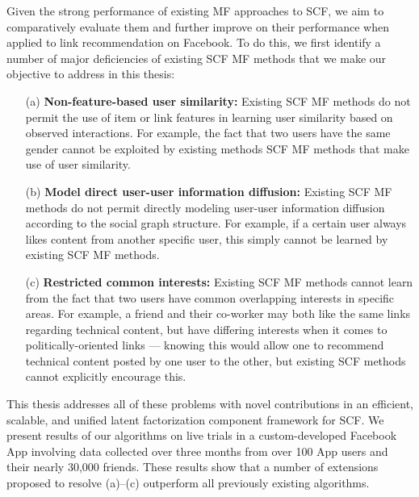Given the strong performance of existing MF approaches to SCF, we aim
to comparatively evaluate them and further improve on their
performance when applied to link recommendation on Facebook.  
To do this, we first identify a number of
major deficiencies of existing SCF MF methods that we make our objective to
address in this thesis:
\begin{enumerate}
\item[(a)] {\bf Non-feature-based user similarity:} Existing SCF MF
methods do not permit the use of item or link features in learning
user similarity based on observed interactions.  For example, 
the fact that two users have the same gender cannot be exploited
by existing methods SCF MF methods that make use of user similarity.
\item[(b)] {\bf Model direct user-user information diffusion:}
Existing SCF MF methods do not permit directly modeling user-user
information diffusion according to the social graph structure.  For example,
if a certain user always likes content from another specific user,
this simply cannot be learned by existing SCF MF methods.
\item[(c)] {\bf Restricted common interests:} Existing SCF MF methods
cannot learn from the fact that two users have common overlapping interests
in specific areas.  For example, a friend and their co-worker may
both like the same links regarding technical content, but have differing
interests when it comes to politically-oriented links --- knowing this
would allow one to recommend technical content posted by one user to the
other, but existing SCF methods cannot explicitly encourage this.
\end{enumerate}

This thesis addresses all of these problems with novel contributions in
an efficient, scalable, and unified latent factorization component
framework for SCF.  We present results of our algorithms on live
trials in a custom-developed Facebook App involving data collected
over three months from over 100 App users and their nearly 30,000
friends.  These results show that a number of extensions proposed to
resolve (a)--(c) outperform all previously existing algorithms.


